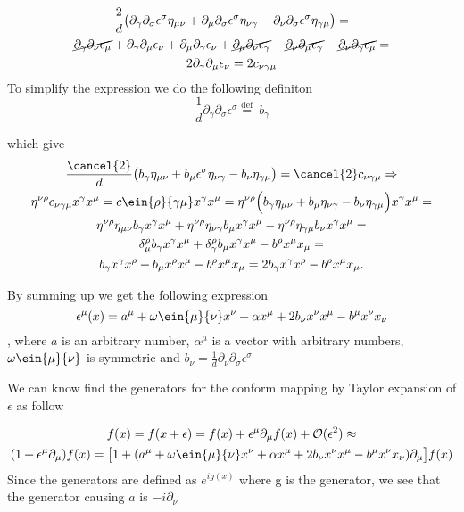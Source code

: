  \begin{gather*}
\frac{2}{d}\big(\partial_\gamma \partial_\sigma \epsilon^\sigma \eta_{\mu \nu}+\partial_\mu \partial_\sigma \epsilon^\sigma \eta_{\nu \gamma}-\partial_\nu \partial_\sigma \epsilon^\sigma \eta_{\gamma \mu}  \big)= \\
\cancel{\partial_\gamma \partial_\nu \epsilon_\mu}+ \partial_\gamma \partial_\mu \epsilon_\nu+
 \partial_\mu \partial_\gamma \epsilon_\nu+ \cancel{\partial_\mu \partial_\nu \epsilon_\gamma}-\cancel{\partial_\nu \partial_\mu \epsilon_\gamma}- \cancel{\partial_\nu \partial_\gamma \epsilon_\mu}=\\2\partial_\gamma \partial_\mu \epsilon_\nu= 2 c_{\nu \gamma \mu}
 \label{eq:stora}
\end{gather*}
To simplify the expression we do the following definiton
\[
\frac{1}{d}\partial_\gamma \partial_\sigma \epsilon^\sigma \stackrel{\mathrm{def}}{=}\ b_\gamma
\]

which give
\begin{gather}
\frac{\cancel{2}}{d}\big(b_\gamma \eta_{\mu \nu}+b_\mu \epsilon^\sigma \eta_{\nu \gamma}-b_\nu\eta_{\gamma \mu}  \big)=\cancel{2} c_{\nu \gamma \mu}
\Rightarrow\\
\eta^{\nu \rho}c_{\nu \gamma \mu}x^\gamma x^\mu=c\ein{\rho}{\gamma \mu}x^\gamma x^\mu=\eta^{\nu \rho}\Big(b_\gamma \eta_{\mu \nu}+b_\mu \eta_{\nu \gamma}-b_\nu\eta_{\gamma \mu} \Big)x^\gamma x^\mu=\\ \eta^{\nu \rho}\eta_{\mu \nu} b_\gamma x^\gamma x^\mu+\eta^{\nu \rho}\eta_{\nu \gamma} b_\mu x^\gamma x^\mu-\eta^{\nu \rho}\eta_{\gamma \mu} b_\nu x^\gamma x^\mu=\\
\delta^\rho _\mu b_\gamma x^\gamma x^\mu+ \delta^\rho _\gamma b_\mu x^\gamma x^\mu - b^\rho x^\mu x_\mu=\\
b_\gamma x^\gamma x^\rho +b_\mu x^\rho x^\mu- b^\rho x^\mu x_\mu=2 b_\gamma x^\gamma x^\rho- b^\rho x^\mu x_\mu.
\end{gather}

 By summing up we get the following expression
 \begin{equation}
 \epsilon^\mu (x)= a^\mu+ \omega \ein{\mu}{\nu}x^\nu + \alpha x^\mu+ 2b_\nu x^\nu x^\mu -b^\mu x^\nu x_\nu
 \end{equation}
 , where $a$ is an arbitrary number, $\alpha^\mu$ is a vector with arbitrary numbers, $\omega\ein{\mu}{\nu}$ is symmetric and $b_\nu=\frac{1}{d}\partial_\nu \partial_\sigma \epsilon^\sigma$
 
We can know find the generators for the conform mapping by Taylor expansion of $\epsilon$ as follow

\begin{gather*}
f(x)=f(x+\epsilon)=f(x)+\epsilon^\mu \partial_\mu f(x)+ \mathcal{O}(\epsilon^2) \approx \\ (1+\epsilon^\mu \partial_\mu)f(x)=\big[1+(a^\mu+ \omega \ein{\mu}{\nu}x^\nu + \alpha x^\mu +2b_\nu x^\nu x^\mu -b^\mu x^\nu x_\nu)\partial_\mu \big]f(x)
\end{gather*}
Since the generators are defined as $e^{i g(x)} $ where g is the generator, we see that the generator causing $a$ is $-i\partial_\nu$
 
